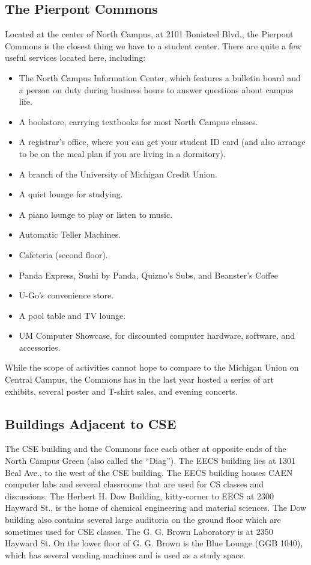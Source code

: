 \documentclass[11pt]{article}
\begin{document}
\subsection{The Pierpont Commons}
\label{sec-3_2}

Located at the center of North Campus, at 2101 Bonisteel Blvd., the Pierpont Commons is the closest thing we have to a student center.  There are quite a few useful services located here, including:

\begin{itemize}
\item The North Campus Information Center, which features a bulletin board
  and a person on duty during business hours to answer questions about
  campus life.
\item A bookstore, carrying textbooks for most North Campus classes.
\item A registrar’s office, where you can get your student ID card (and also arrange to be on the meal plan if you are living in a dormitory).
\item A branch of the University of Michigan Credit Union.
\item A quiet lounge for studying.
\item A piano lounge to play or listen to music.
\item Automatic Teller Machines.
\item Cafeteria (second floor).
\item Panda Express, Sushi by Panda, Quizno’s Subs, and Beanster’s Coffee
\item U-Go’s convenience store.
\item A pool table and TV lounge.
\item UM Computer Showcase, for discounted computer hardware, software, and accessories.
\end{itemize}

While the scope of activities cannot hope to compare to the Michigan Union on Central Campus, the Commons has in the last year hosted a series of art exhibits, several poster and T-shirt sales, and evening concerts.
\subsection{Buildings Adjacent to CSE}
\label{sec-3_3}

The CSE building and the Commons face each other at opposite ends of
the North Campus Green (also called the “Diag”).  The EECS building
lies at 1301 Beal Ave., to the west of the CSE building.  The EECS
building houses CAEN computer labs and several classrooms that are
used for CS classes and discussions.  The Herbert H. Dow Building,
kitty-corner to EECS at 2300 Hayward St., is the home of chemical
engineering and material sciences.  The Dow building also contains
several large auditoria on the ground floor which are sometimes used
for CSE classes.  The G. G. Brown Laboratory is at 2350 Hayward St.
On the lower floor of G. G. Brown is the Blue Lounge (GGB 1040), which
has several vending machines and is used as a study space.
\end{document}
